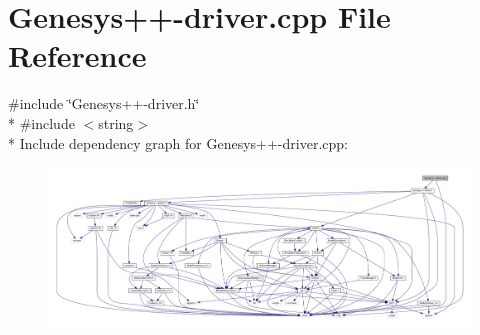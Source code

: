 \hypertarget{_genesys_09_09-driver_8cpp}{\section{Genesys++-\/driver.cpp File Reference}
\label{_genesys_09_09-driver_8cpp}
}
{\ttfamily \#include \char`\"{}Genesys++-\/driver.\-h\char`\"{}}\\*
{\ttfamily \#include $<$string$>$}\\*
Include dependency graph for Genesys++-\/driver.cpp\-:
\nopagebreak
\begin{figure}[H]
\begin{center}
\leavevmode
\includegraphics[width=350pt]{_genesys_09_09-driver_8cpp__incl}
\end{center}
\end{figure}
